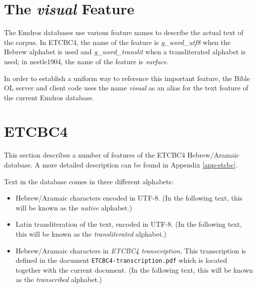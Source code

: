 \documentclass[11pt,oneside,a4paper]{memoir}
\begin{document}
\section{The \emph{visual} Feature}\label{sec-visual}

The Emdros databases use various feature names to describe the actual text of the corpus. In ETCBC4,
the name of the feature is \emph{g\_word\_utf8} when the Hebrew alphabet is used and
\emph{g\_word\_translit} when a transliterated alphabet is used; in nestle1904, the name of the feature
is \emph{surface.}

In order to establish a uniform way to reference this important feature, the Bible OL server and
client code uses the name \emph{visual} as an alias for the text feature of the current Emdros
database.



\section{ETCBC4}

This section describes a number of features of the ETCBC4 Hebrew/Aramaic database. A more detailed
description can be found in Appendix \ref{app-etcbc}.

Text in the database comes in three different alphabets:

\begin{itemize}

\item Hebrew/Aramaic characters encoded in UTF-8. (In the following
  text, this will be known as the \emph{native} alphabet.)%

\item Latin transliteration of the text, encoded in UTF-8. (In the
  following text, this will be known as the \emph{transliterated} alphabet.)%

\item Hebrew/Aramaic characters in \emph{ETCBC4 transcription}.%
  \label{page-transcribed}
  This transcription is defined in the document \texttt{ETCBC4-transcription.pdf} which is located
  together with the current document. (In the
  following text, this will be known as the \emph{transcribed} alphabet.)

\end{itemize}
\end{document}
